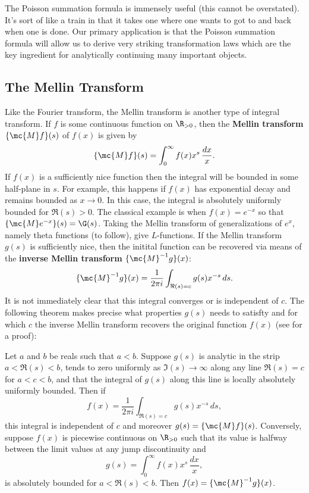         The Poisson summation formula is immensely useful (this cannot be overstated). It's sort of like a train in that it takes one where one wants to got to and back when one is done. Our primary application is that the Poisson summation formula will allow us to derive very striking transformation laws which are the key ingredient for analytically continuing many important objects.
      \subsection*{The Mellin Transform}
        Like the Fourier transform, the Mellin transform is another type of integral transform. If $f$ is some continuous function on $\R_{>0}$, then the \textbf{Mellin transform} $\{\mc{M}f\}(s)$ of $f(x)$ is given by
        \[
          \{\mc{M}f\}(s) = \int_{0}^{\infty}f(x)x^{s}\,\frac{dx}{x}.
        \]
        If $f(x)$ is a sufficiently nice function then the integral will be bounded in some half-plane in $s$. For example, this happens if $f(x)$ has exponential decay and remains bounded as $x \to 0$. In this case, the integral is absolutely uniformly bounded for $\Re(s) > 0$. The classical example is when $f(x) = e^{-x}$ so that $\{\mc{M}e^{-x}\}(s) = \G(s)$. Taking the Mellin transform of generalizations of $e^{x}$, namely theta functions (to follow), give $L$-functions. If the Mellin transform $g(s)$ is sufficiently nice, then the initital function can be recovered via means of the \textbf{inverse Mellin transform} $\{\mc{M}^{-1}g\}(x)$:
        \[
          \{\mc{M}^{-1}g\}(x) = \frac{1}{2\pi i}\int_{\Re(s) = c}g(s)x^{-s}\,ds.
        \]
        It is not immediately clear that this integral converges or is independent of $c$. The following theorem makes precise what properties $g(s)$ needs to satisfty and for which $c$ the inverse Mellin transform recovers the original function $f(x)$ (see \cite{debnath2002integral} for a proof):

        \begin{theorem}
          Let $a$ and $b$ be reals such that $a < b$. Suppose $g(s)$ is analytic in the strip $a < \Re(s) < b$, tends to zero uniformly as $\Im(s) \to \infty$ along any line $\Re(s) = c$ for $a < c < b$, and that the integral of $g(s)$ along this line is locally absolutely uniformly bounded. Then if
          \[
            f(x) = \frac{1}{2\pi i}\int_{\Re(s) = c}g(s)x^{-s}\,ds,
          \]
          this integral is independent of $c$ and moreover $g(s) = \{\mc{M}f\}(s)$. Conversely, suppose $f(x)$ is piecewise continuous on $\R_{>0}$ such that its value is halfway between the limit values at any jump discontinuity and
          \[
            g(s) = \int_{0}^{\infty}f(x)x^{s}\,\frac{dx}{x},
          \]
          is absolutely bounded for $a < \Re(s) < b$. Then $f(x) = \{\mc{M}^{-1}g\}(x)$.
        \end{theorem}

